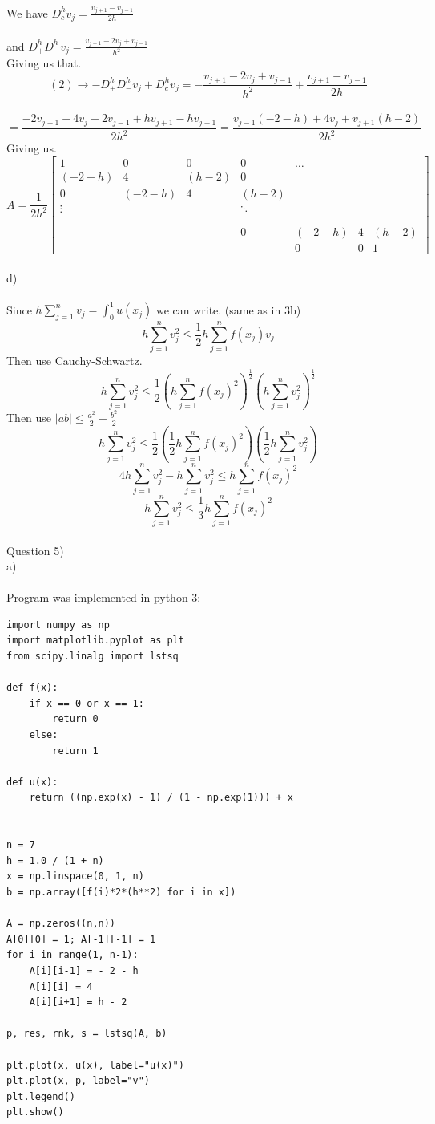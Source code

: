 \documentclass[12pt, letterpaper, twoside]{article}
\begin{document}
\ \\
We have $D_c^h v_j = \frac{v_{j+1} - v_{j-1}}{2h}$\\
\ \\
and $D_+^h D_-^h v_j = \frac{v_{j+1} -2v_j + v_{j-1}}{h^2}$\\
Giving us that.
$$
(2) \rightarrow - D_+^h D_-^h v_j + D_c^h v_j 
= 
- \frac{v_{j+1} -2v_j + v_{j-1}}{h^2} + \frac{v_{j+1} - v_{j-1}}{2h}
$$
\ \\
$$
=
\frac{-2v_{j+1} + 4v_j - 2v_{j-1} + hv_{j+1} - hv_{j-1}}{2h^2}
=
\frac{v_{j-1}(-2-h) + 4v_j + v_{j+1}(h - 2)}{2h^2}
$$
Giving us.\\
$$
A = \frac{1}{2h^2}
\begin{bmatrix}
1 & 0 & 0 & 0 & \dots\\
(-2-h) & 4 & (h - 2) & 0\\
0 & (-2-h) & 4 & (h - 2) &\\
\vdots & & & \ddots\\
\\
\\
& & & 0 & (-2-h) & 4 & (h - 2)\\
& & & & 0 & 0 & 1  
\end{bmatrix}
$$
\newpage
\ \\
d)\\
\ \\
Since $h \sum_{j=1}^n v_j = \int_0^1 u(x_j)$ we can write. (same as in 3b)
$$
h \sum_{j=1}^n v_j^2 \leq \frac{1}{2} h \sum_{j=1}^n f(x_j) v_j
$$
Then use Cauchy-Schwartz.
$$
h \sum_{j=1}^n v_j^2 \leq \frac{1}{2} \left( h \sum_{j=1}^n f(x_j)^2 \right)^{\frac{1}{2}} 
\left( h \sum_{j=1}^n v_j^2 \right)^{\frac{1}{2}}
$$
Then use $|ab| \leq \frac{a^2}{2} + \frac{b^2}{2}$
$$
h \sum_{j=1}^n v_j^2 \leq \frac{1}{2} \left( \frac{1}{2} h \sum_{j=1}^n f(x_j)^2 \right)
\left( \frac{1}{2} h \sum_{j=1}^n v_j^2 \right)
$$
$$
4 h \sum_{j=1}^n v_j^2 - h \sum_{j=1}^n v_j^2 \leq h \sum_{j=1}^n f(x_j)^2
$$
$$
h \sum_{j=1}^n v_j^2 \leq \frac{1}{3} h \sum_{j=1}^n f(x_j)^2
$$
\newpage
\ \\
Question 5)\\
a)\\
\ \\
Program was implemented in python 3:
\begin{verbatim}
import numpy as np
import matplotlib.pyplot as plt
from scipy.linalg import lstsq

def f(x):
    if x == 0 or x == 1:
        return 0
    else:
        return 1

def u(x):
    return ((np.exp(x) - 1) / (1 - np.exp(1))) + x


n = 7
h = 1.0 / (1 + n) 
x = np.linspace(0, 1, n)
b = np.array([f(i)*2*(h**2) for i in x])

A = np.zeros((n,n))
A[0][0] = 1; A[-1][-1] = 1
for i in range(1, n-1):
    A[i][i-1] = - 2 - h
    A[i][i] = 4
    A[i][i+1] = h - 2

p, res, rnk, s = lstsq(A, b)

plt.plot(x, u(x), label="u(x)")
plt.plot(x, p, label="v")
plt.legend()
plt.show()
\end{verbatim}
\end{document}
